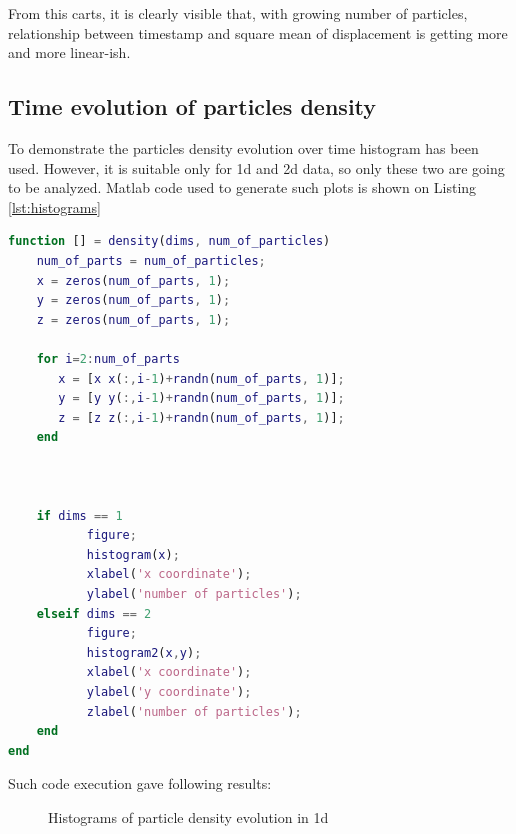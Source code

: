 \documentclass[onecolumn]{article}
\begin{document}
From this carts, it is clearly visible that, with growing number of particles, relationship between timestamp and square mean of displacement is getting more and more linear-ish.


\subsection{Time evolution of particles density}

To demonstrate the particles density evolution over time histogram has been used. However, it is suitable only for 1d and 2d data, so only these two are going to be analyzed. Matlab code used to generate such plots is shown on Listing \ref{lst:histograms}

\vspace{1em}

\begin{lstlisting}[language=Matlab,frame=single,label={lst:histograms},breaklines=true,caption={Function that calculates particles density evolution}]
function [] = density(dims, num_of_particles)
    num_of_parts = num_of_particles;
    x = zeros(num_of_parts, 1);
    y = zeros(num_of_parts, 1);
    z = zeros(num_of_parts, 1);

    for i=2:num_of_parts
       x = [x x(:,i-1)+randn(num_of_parts, 1)];
       y = [y y(:,i-1)+randn(num_of_parts, 1)];
       z = [z z(:,i-1)+randn(num_of_parts, 1)];
    end
    
    

    if dims == 1
           figure;
           histogram(x);
           xlabel('x coordinate');
           ylabel('number of particles');
    elseif dims == 2
           figure;
           histogram2(x,y);
           xlabel('x coordinate');
           ylabel('y coordinate');
           zlabel('number of particles');
    end
end
\end{lstlisting}

\vspace{1em}

Such code execution gave following results:

\begin{figure}[H]
\noindent{}
\caption{Histograms of particle density evolution in 1d}
\label{fig:hist_1d}
\end{figure}
\end{document}
